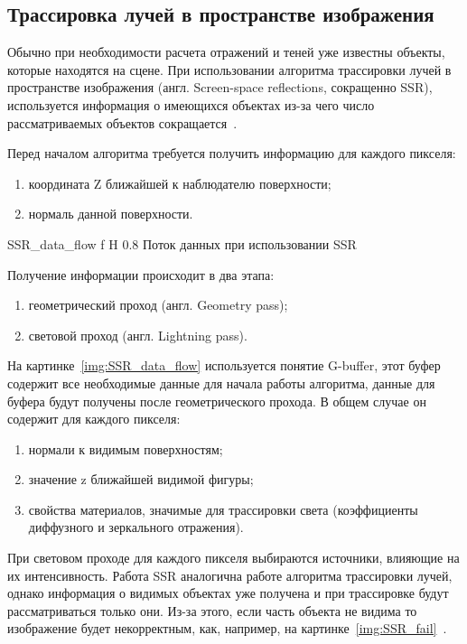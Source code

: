 \subsection{Трассировка лучей в пространстве изображения}
Обычно при необходимости расчета отражений и теней уже известны объекты, которые находятся на сцене. При использовании алгоритма трассировки лучей в пространстве изображения (англ. Screen-space reflections, сокращенно SSR), используется информация о имеющихся
объектах из-за чего число рассматриваемых объектов сокращается~\cite{SSR}.

Перед началом алгоритма требуется получить информацию для каждого пикселя:
\begin{enumerate}
	\item координата Z ближайшей к наблюдателю поверхности;
	\item нормаль данной поверхности.
\end{enumerate}



{SSR_data_flow} %
{f} %
{H} %
{0.8\textwidth} %
{Поток данных при использовании SSR} %



Получение информации происходит в два этапа:
\begin{enumerate}
	\item геометрический проход (англ. Geometry pass);
	\item световой проход (англ. Lightning pass).
\end{enumerate}

На картинке~\ref{img:SSR_data_flow} используется понятие G-buffer, этот буфер содержит все необходимые данные для начала работы алгоритма, данные для буфера
будут получены после геометрического прохода. В общем случае он содержит для каждого пикселя:
\begin{enumerate}
	\item нормали к видимым поверхностям;
	\item значение z ближайшей видимой фигуры;
	\item свойства материалов, значимые для трассировки света (коэффициенты диффузного и зеркального отражения).
\end{enumerate}
При световом проходе для каждого пикселя выбираются источники, влияющие на их интенсивность.
Работа SSR аналогична работе алгоритма трассировки лучей, однако информация о видимых объектах уже получена и при трассировке будут рассматриваться только они.
Из-за этого, если часть объекта не видима то изображение будет некорректным, как, например, на картинке~\ref{img:SSR_fail}~\cite{SSR,reflexion_types}.


